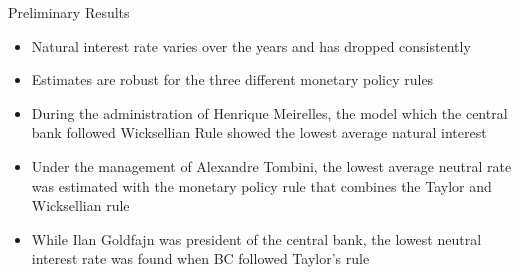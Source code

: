 \documentclass[9pt]{beamer}
\begin{document}
\begin{frame}{Preliminary Results}
\begin{itemize}
    \item Natural interest rate varies over the years and has dropped consistently
    
    \item Estimates are robust for the three different monetary policy rules
    
    \item During the administration of Henrique Meirelles, the model which the central bank followed Wicksellian Rule showed the lowest average natural interest
    
    \item Under the management of Alexandre Tombini, the lowest average neutral rate was estimated with the monetary policy rule that combines the Taylor and Wicksellian rule 
    
    \item While Ilan Goldfajn was president of the central bank, the lowest neutral interest rate was found when BC followed Taylor's rule
    
\end{itemize}


\end{frame}
\end{document}

